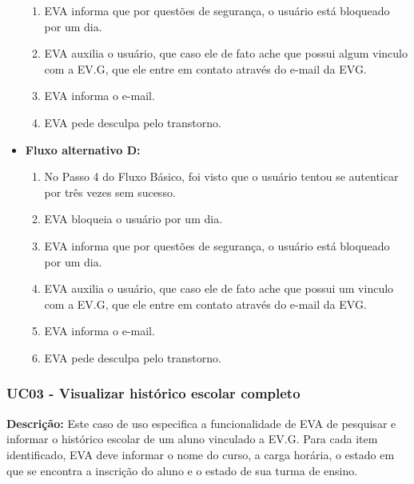 \begin{itemize}
\begin{enumerate}
            \item EVA informa que por questões de segurança, o usuário está bloqueado por um dia.
            \item EVA auxilia o usuário, que caso ele de fato ache que possui algum vinculo com a EV.G, que ele entre em contato através do e-mail da EVG.
            \item EVA informa o e-mail.
            \item EVA pede desculpa pelo transtorno.
        \end{enumerate}
    \item \textbf{Fluxo alternativo D:}
        \begin{enumerate}
            \item No Passo 4 do Fluxo Básico, foi visto que o usuário tentou se autenticar por três vezes sem sucesso.
            \item EVA bloqueia o usuário por um dia.
            \item EVA informa que por questões de segurança, o usuário está bloqueado por um dia.
            \item EVA auxilia o usuário, que caso ele de fato ache que possui um vinculo com a EV.G, que ele entre em contato através do e-mail da EVG.
            \item EVA informa o e-mail.
            \item EVA pede desculpa pelo transtorno.
        \end{enumerate}
\end{itemize}

\subsubsection{UC03 - Visualizar histórico escolar completo}
\textbf{Descrição:} Este caso de uso especifica a funcionalidade de EVA de pesquisar e informar o histórico escolar de um aluno vinculado a EV.G. Para cada item identificado, EVA deve informar o nome do curso, a carga horária, o estado em que se encontra a inscrição do aluno e o estado de sua turma de ensino. 

